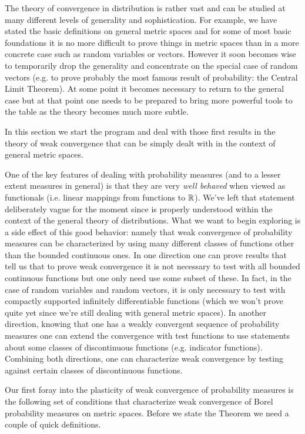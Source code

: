 The theory of convergence in distribution is rather vast and can be
studied at many different levels of generality and sophistication.
For example, we have stated the basic definitions on general metric
spaces and for some of most basic foundations it is no more difficult
to prove things in metric spaces than in a more concrete case such as
random variables or vectors.  However it soon becomes wise to
temporarily drop the generality and concentrate on the special case of
random vectors (e.g. to prove probably the most famous result of
probability: the Central Limit Theorem).  At some point it becomes
necessary to return to the general case but at that point one needs to
be prepared to bring more powerful tools to the table as the theory
becomes much more subtle.

In this section we start the program and deal with those first
results in the theory of weak convergence that can be simply dealt
with in the context of general metric spaces.

One of the key features of dealing with probability measures (and to
a lesser extent measures in general) is that they are very \emph{well
  behaved} when viewed as functionals (i.e. linear mappings from
functions to $\mathbb{R}$).  We've left that statement deliberately vague
for the moment since is properly understood within the context of the
general theory of distributions.  What we want to begin exploring is a
side effect of this good behavior: namely that weak convergence of
probability measures can be characterized by using many different
classes of functions other than the bounded continuous ones.  In one
direction one can prove results that tell us that to prove weak
convergence it is not necessary to test with all bounded continuous
functions but one only need use some subset of these. In fact, in the
case of random variables and random vectors, it is
only necessary to test with compactly supported
infinitely differentiable functions (which we won't prove quite yet
since we're still dealing with general metric spaces).
In another direction, knowing that one has a weakly convergent
sequence of probability measures one can extend the convergence with
test functions to use statements about some classes of discontinuous functions
(e.g. indicator functions).  Combining both directions, one can
characterize weak convergence by testing against certain classes of
discontinuous functions.  

Our first foray into the plasticity of weak convergence of probability
measures is the following set of conditions that characterize weak
convergence of Borel probability measures on metric spaces.  Before we
state the Theorem we need a couple of quick definitions.

